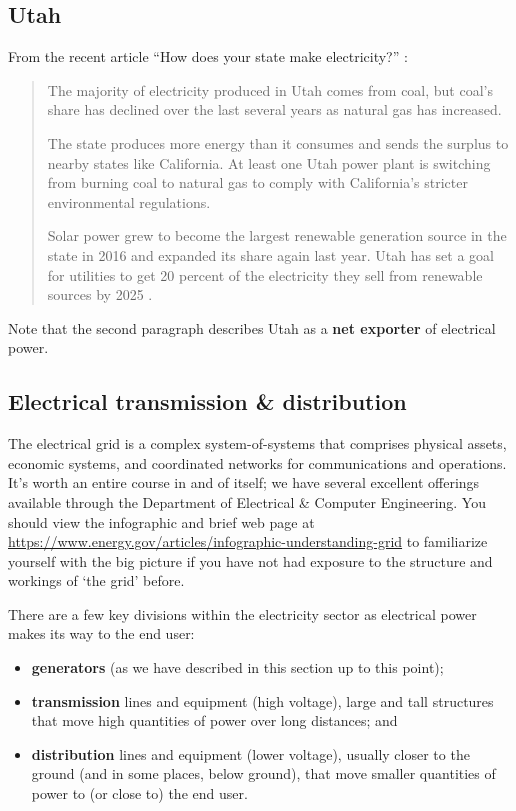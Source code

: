 \documentclass[10pt]{article}
\begin{document}
\subsection{Utah}

From the recent article ``How does your state make electricity?'' \cite{Popovich2018}:

\begin{quote}

The majority of electricity produced in Utah comes from coal, but coal's share has declined over the last several years as natural gas has increased.

The state produces more energy than it consumes and sends the surplus to nearby states like California. At least one Utah power plant \cite{Linthicum2013} is switching from burning coal to natural gas to comply with California's stricter environmental regulations.

Solar power grew to become the largest renewable generation source in the state in 2016 \cite{brightfuture} and expanded its share again last year. Utah has set a goal for utilities to get 20 percent of the electricity they sell from renewable sources by 2025 \cite{noauthor_undated-xb}.

\end{quote}

Note that the second paragraph describes Utah as a \textbf{net exporter} of electrical power.


\subsection{Electrical transmission \& distribution}

The electrical grid is a complex system-of-systems that comprises physical assets, economic systems, and coordinated networks for communications and operations. It's worth an entire course in and of itself; we have several excellent offerings available through the Department of Electrical \& Computer Engineering. You should view the infographic and brief web page at \url{https://www.energy.gov/articles/infographic-understanding-grid} to familiarize yourself with the big picture if you have not had exposure to the structure and workings of `the grid' before.

There are a few key divisions within the electricity sector as electrical power makes its way to the end user: 

\begin{itemize}
    \item \textbf{generators} (as we have described in this section up to this point);
    \item \textbf{transmission} lines and equipment (high voltage), large and tall structures that move high quantities of power over long distances; and
    \item \textbf{distribution} lines and equipment (lower voltage), usually closer to the ground (and in some places, below ground), that move smaller quantities of power to (or close to) the end user.
\end{itemize}
\end{document}
